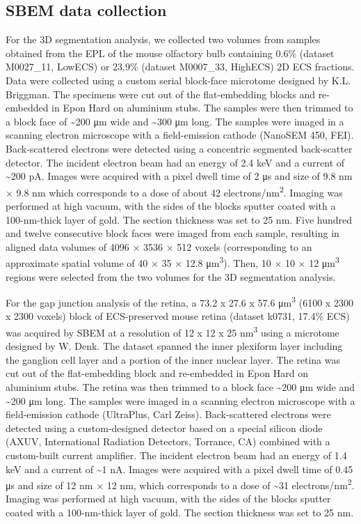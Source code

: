 \documentclass{article}
\begin{document}
\subsection*{SBEM data collection}

For the 3D segmentation analysis, we collected two volumes from samples obtained from the EPL of the mouse olfactory bulb containing 0.6\% (dataset M0027\_11, LowECS) or 23.9\% (dataset M0007\_33, HighECS) 2D ECS fractions. Data were collected using a custom serial block-face microtome designed by K.L. Briggman. The specimens were cut out of the flat-embedding blocks and re-embedded in Epon Hard on aluminium stubs. The samples were then trimmed to a block face of \textasciitilde200 μm wide and \textasciitilde300 μm long. The samples were imaged in a scanning electron microscope with a field-emission cathode (NanoSEM 450, FEI). Back-scattered electrons were detected using a concentric segmented back-scatter detector. The incident electron beam had an energy of 2.4 keV and a current of \textasciitilde200 pA. Images were acquired with a pixel dwell time of 2 μs and size of 9.8 nm × 9.8 nm which corresponds to a dose of about 42 electrons/nm\textsuperscript{2}. Imaging was performed at high vacuum, with the sides of the blocks sputter coated with a 100-nm-thick layer of gold. The section thickness was set to 25 nm. Five hundred and twelve consecutive block faces were imaged from each sample, resulting in aligned data volumes of 4096 × 3536 × 512 voxels (corresponding to an approximate spatial volume of 40 × 35 × 12.8 μm\textsuperscript{3}). Then, 10 × 10 × 12 μm\textsuperscript{3} regions were selected from the two volumes for the 3D segmentation analysis.

For the gap junction analysis of the retina, a 73.2 x 27.6 x 57.6 μm\textsuperscript{3} (6100 x 2300 x 2300 voxels) block of ECS-preserved mouse retina (dataset k0731, 17.4\% ECS) was acquired by SBEM at a resolution of 12 x 12 x 25 nm\textsuperscript{3} using a microtome designed by W. Denk. The dataset spanned the inner plexiform layer including the ganglion cell layer and a portion of the inner nuclear layer. The retina was cut out of the flat-embedding block and re-embedded in Epon Hard on aluminium stubs. The retina was then trimmed to a block face \textasciitilde200 μm wide and \textasciitilde200 μm long. The samples were imaged in a scanning electron microscope with a field-emission cathode (UltraPlus, Carl Zeiss). Back-scattered electrons were detected using a custom-designed detector based on a special silicon diode (AXUV, International Radiation Detectors, Torrance, CA) combined with a custom-built current amplifier. The incident electron beam had an energy of 1.4 keV and a current of \textasciitilde1 nA. Images were acquired with a pixel dwell time of 0.45 μs and size of 12 nm × 12 nm, which corresponds to a dose of \textasciitilde31 electrons/nm\textsuperscript{2}. Imaging was performed at high vacuum, with the sides of the blocks sputter coated with a 100-nm-thick layer of gold. The section thickness was set to 25 nm.
\end{document}

